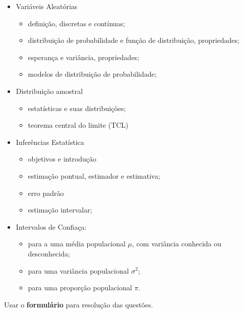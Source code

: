 \documentclass[
]{article}
\providecommand{\tightlist}{%
  \setlength{\itemsep}{0pt}\setlength{\parskip}{0pt}}
\begin{document}
\begin{itemize}
\tightlist
\item
  Variáveis Aleatórias

  \begin{itemize}
  \tightlist
  \item
    definição, discretas e contínuas;
  \item
    distribuição de probabilidade e função de distribuição,
    propriedades;
  \item
    esperança e variância, propriedades;
  \item
    modelos de distribuição de probabilidade;
  \end{itemize}
\item
  Distribuição amostral

  \begin{itemize}
  \tightlist
  \item
    estatísticas e suas distribuições;
  \item
    teorema central do limite (TCL)
  \end{itemize}
\item
  Inferências Estatística

  \begin{itemize}
  \tightlist
  \item
    objetivos e introdução
  \item
    estimação pontual, estimador e estimativa;
  \item
    erro padrão
  \item
    estimação intervalar;
  \end{itemize}
\item
  Intervalos de Confiaça:

  \begin{itemize}
  \tightlist
  \item
    para a uma média populacional \(\mu\), com variância conhecida ou
    desconhecida;
  \item
    para uma variância populacional \(\sigma^2\);
  \item
    para uma proporção populacional \(\pi\).
  \end{itemize}
\end{itemize}

\vspace{0.5cm}

Usar o \textbf{formulário} para resolução das questões.

\vspace{0.5cm}
\end{document}
